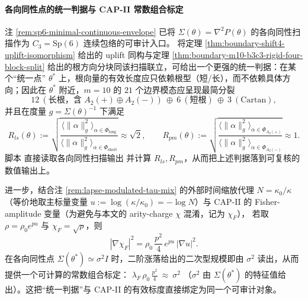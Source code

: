 \paragraph{各向同性点的统一判据与 CAP-II 常数组合标定}
注 \ref{rem:sp6-minimal-continuous-envelope} 已将 \(\Sigma(\theta)=\nabla^2P(\theta)\) 的各向同性扫描作为 \(C_3=\mathrm{Sp}(6)\) 连续包络的可审计入口。
将定理 \ref{thm:boundary-shift4-uplift-isomorphism} 给出的 uplift 同构与定理 \ref{thm:boundary-m10-b3c3-rigid-four-block-split} 给出的根方向分块同该扫描联立，可给出一个更强的统一判据：在某个“统一点” \(\theta^*\) 上，根向量的有效长度应只依赖根型（短/长），而不依赖具体方向；因此在 \(\theta^*\) 附近，\(m=10\) 的 \(21\) 个边界模态应呈现最简分裂
\[
12\ (\text{长根，含 }A_2(+)\oplus A_2(-))\ \oplus\ 6\ (\text{短根})\ \oplus\ 3\ (\text{Cartan}),
\]
并且在度量 \(g=\Sigma(\theta)^{-1}\) 下满足
\[
R_{ls}(\theta):=\sqrt{\frac{\langle\|\alpha\|^2_g\rangle_{\alpha\in\Phi_{\mathrm{long}}}}{\langle\|\alpha\|^2_g\rangle_{\alpha\in\Phi_{\mathrm{short}}}}}
\approx \sqrt{2},\qquad
R_{pm}(\theta):=\sqrt{\frac{\langle\|\alpha\|^2_g\rangle_{\alpha\in\Phi_{A_2(+)}}}{\langle\|\alpha\|^2_g\rangle_{\alpha\in\Phi_{A_2(-)}}}}
\approx 1.
\]
脚本 \texttt{} 直接读取各向同性扫描输出
\texttt{} 并计算 \(R_{ls},R_{pm}\)，从而把上述判据落到可复核的数值输出上。
\par
进一步，结合注 \ref{rem:lapse-modulated-tau-mix} 的外部时间缩放代理 \(N=\kappa_0/\kappa\)（等价地取主标量变量 \(u:=\log(\kappa/\kappa_0)=-\log N\)）与 CAP-II 的 Fisher-amplitude 变量（为避免与本文的 arity-charge \(\chi\) 混淆，记为 \(\chi_F\)），
若取 \(\rho=\rho_0 e^{p u}\) 与 \(\chi_F=\sqrt{\rho}\)，则
\[
|\nabla\chi_F|^2=\rho_0\,\frac{p^2}{4}\,e^{p u}\,|\nabla u|^2.
\]
在各向同性点 \(\Sigma(\theta^*)\simeq\sigma^2 I\) 时，二阶涨落给出的二次型规模即由 \(\sigma^2\) 读出，从而提供一个可计算的常数组合标定：
\(
\lambda_F\,\rho_0\,\frac{p^2}{4}\ \approx\ \sigma^2
\)
（\(\sigma^2\) 由 \(\Sigma(\theta^*)\) 的特征值给出）。这把“统一判据”与 CAP-II 的有效标度直接绑定为同一个可审计对象。

